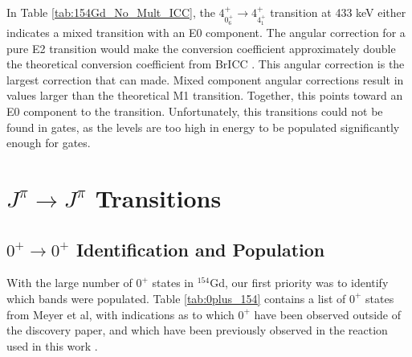 In Table \ref{tab:154Gd_No_Mult_ICC}, the $4^+_{0^+_6}\rightarrow 4^+_{4^+_1}$ transition at 433 keV either indicates a mixed transition with an E0 component. The angular correction for a pure E2 transition would make the conversion coefficient approximately double the theoretical conversion coefficient from BrICC \citep{kibedi08:_BRICC}. This angular correction is the largest correction that can made. Mixed component angular corrections result in values larger than the theoretical M1 transition. Together, this points toward an E0 component to the transition. Unfortunately, this transitions could not be found in gates, as the levels are too high in energy to be populated significantly enough for gates.

\section{$J^{\pi}\rightarrow J^{\pi}$ Transitions}
\label{sec:154_J2J}

\subsection{$0^{+}\rightarrow 0^{+}$ Identification and Population}

With the large number of $0^+$ states in $^{154}$Gd, our first priority was to identify which bands were populated. Table \ref{tab:0plus_154} contains a list of $0^+$ states from Meyer et al, with indications as to which $0^+$ have been observed outside of the discovery paper, and which have been previously observed in the reaction used in this work \cite{meyer06:_zeroplus}.



